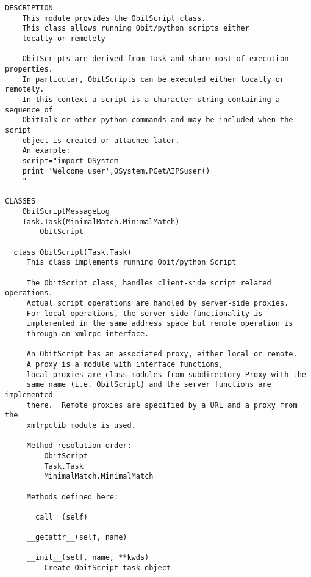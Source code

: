 \documentclass[11pt]{report}
\begin{document}
\begin{verbatim}
DESCRIPTION
    This module provides the ObitScript class.
    This class allows running Obit/python scripts either
    locally or remotely
    
    ObitScripts are derived from Task and share most of execution properties.
    In particular, ObitScripts can be executed either locally or remotely.
    In this context a script is a character string containing a sequence of
    ObitTalk or other python commands and may be included when the script
    object is created or attached later.
    An example:
    script="import OSystem
    print 'Welcome user',OSystem.PGetAIPSuser()
    "

CLASSES
    ObitScriptMessageLog
    Task.Task(MinimalMatch.MinimalMatch)
        ObitScript
    
  class ObitScript(Task.Task)
     This class implements running Obit/python Script
     
     The ObitScript class, handles client-side script related operations.
     Actual script operations are handled by server-side proxies.
     For local operations, the server-side functionality is
     implemented in the same address space but remote operation is
     through an xmlrpc interface.  
     
     An ObitScript has an associated proxy, either local or remote.
     A proxy is a module with interface functions,
     local proxies are class modules from subdirectory Proxy with the
     same name (i.e. ObitScript) and the server functions are implemented
     there.  Remote proxies are specified by a URL and a proxy from the
     xmlrpclib module is used.
     
     Method resolution order:
         ObitScript
         Task.Task
         MinimalMatch.MinimalMatch
     
     Methods defined here:
     
     __call__(self)
     
     __getattr__(self, name)
     
     __init__(self, name, **kwds)
         Create ObitScript task object
         

\end{verbatim}
\end{document}
